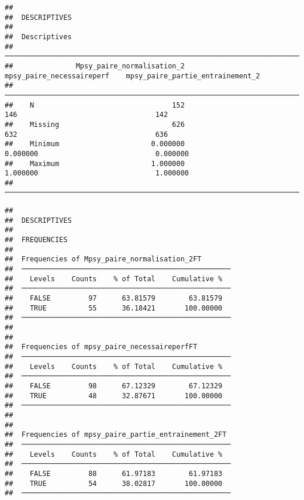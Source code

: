 \documentclass[
]{article}
\begin{document}
\begin{verbatim}
## 
##  DESCRIPTIVES
## 
##  Descriptives                                                                                               
##  ────────────────────────────────────────────────────────────────────────────────────────────────────────── 
##               Mpsy_paire_normalisation_2    mpsy_paire_necessaireperf    mpsy_paire_partie_entrainement_2   
##  ────────────────────────────────────────────────────────────────────────────────────────────────────────── 
##    N                                 152                          146                                 142   
##    Missing                           626                          632                                 636   
##    Minimum                      0.000000                     0.000000                            0.000000   
##    Maximum                      1.000000                     1.000000                            1.000000   
##  ──────────────────────────────────────────────────────────────────────────────────────────────────────────
\end{verbatim}

\begin{verbatim}
## 
##  DESCRIPTIVES
## 
##  FREQUENCIES
## 
##  Frequencies of Mpsy_paire_normalisation_2FT        
##  ────────────────────────────────────────────────── 
##    Levels    Counts    % of Total    Cumulative %   
##  ────────────────────────────────────────────────── 
##    FALSE         97      63.81579        63.81579   
##    TRUE          55      36.18421       100.00000   
##  ────────────────────────────────────────────────── 
## 
## 
##  Frequencies of mpsy_paire_necessaireperfFT         
##  ────────────────────────────────────────────────── 
##    Levels    Counts    % of Total    Cumulative %   
##  ────────────────────────────────────────────────── 
##    FALSE         98      67.12329        67.12329   
##    TRUE          48      32.87671       100.00000   
##  ────────────────────────────────────────────────── 
## 
## 
##  Frequencies of mpsy_paire_partie_entrainement_2FT  
##  ────────────────────────────────────────────────── 
##    Levels    Counts    % of Total    Cumulative %   
##  ────────────────────────────────────────────────── 
##    FALSE         88      61.97183        61.97183   
##    TRUE          54      38.02817       100.00000   
##  ──────────────────────────────────────────────────
\end{verbatim}
\end{document}

